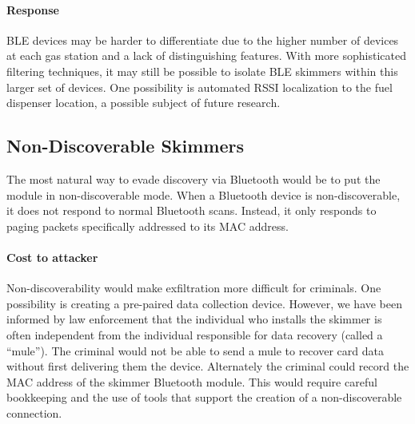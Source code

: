 \paragraph{Response} BLE devices may be harder to differentiate due to the higher number of devices at each gas
station and a lack of distinguishing features.
%
With more sophisticated filtering techniques, it may still be possible to isolate BLE skimmers within
this larger set of devices.
%
One possibility is automated RSSI localization to the fuel dispenser location, a possible subject of future research.

\subsection{Non-Discoverable Skimmers}
\label{sec:hiding:desc}

The most natural way to evade discovery via Bluetooth would be to put the module in non-discoverable mode.
%
When a Bluetooth device is non-discoverable, it does not respond to normal Bluetooth scans.
%
Instead, it only responds to paging packets specifically addressed to its MAC address.

\paragraph{Cost to attacker} Non-discoverability would make exfiltration more difficult for criminals.
%
One possibility is creating a pre-paired data collection device.
%
However, we have been informed by law enforcement that the individual who installs the skimmer is often independent
from the individual responsible for data recovery (called a ``mule'').
%
The criminal would not be able to send a mule to recover card data without first delivering them the device.
%
Alternately the criminal could record the MAC address of the skimmer Bluetooth module.
%
This would require careful bookkeeping and the use of tools that support the creation of a non-discoverable connection.

